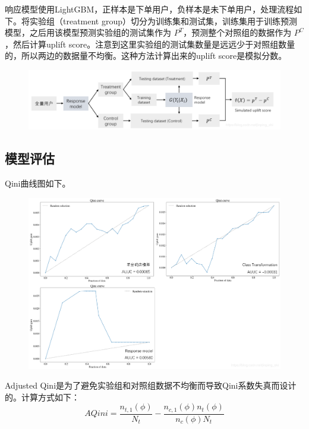 \documentclass[12pt]{article}
\begin{document}
响应模型使用LightGBM，正样本是下单用户，负样本是未下单用户，处理流程如下。将实验组（treatment group）切分为训练集和测试集，训练集用于训练预测模型，之后用该模型预测实验组的测试集作为 $P^T$，预测整个对照组的数据作为 $P^C$，然后计算uplift score。注意到这里实验组的测试集数量是远远少于对照组数量的，所以两边的数据量不均衡。这种方法计算出来的uplift score是模拟分数。
\begin{figure}[H]
    \centering
    \includegraphics[width=1\textwidth]{fig/CasualInference-Uplift_Model_Demo5.png}
\end{figure}

\subsection{模型评估}
Qini曲线图如下。
\begin{figure}[H]
    \centering
    \includegraphics[width=1\textwidth]{fig/CasualInference-Uplift_Model_Demo6.png}
\end{figure}

Adjusted Qini是为了避免实验组和对照组数据不均衡而导致Qini系数失真而设计的。计算方式如下：
$$
AQini = \frac{n_{t,1}(\phi)}{N_t} - \frac{n_{c,1}(\phi)n_t(\phi)}{n_c(\phi)N_t}
$$
\end{document}
